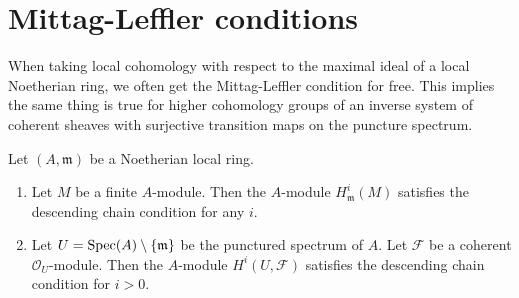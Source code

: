\section{Mittag-Leffler conditions}
\label{section-ML}

\noindent
When taking local cohomology with respect to the maximal ideal
of a local Noetherian ring, we often get the Mittag-Leffler condition
for free. This implies the same thing is true for higher cohomology
groups of an inverse system of coherent sheaves with surjective transition
maps on the puncture spectrum.

\begin{lemma}
\label{lemma-descending-chain}
Let $(A, \mathfrak m)$ be a Noetherian local ring.
\begin{enumerate}
\item Let $M$ be a finite $A$-module. Then the $A$-module
$H^i_\mathfrak m(M)$ satisfies the descending chain condition
for any $i$.
\item Let $U = \mathop{\mathrm{Spec}}(A) \setminus \{\mathfrak m\}$ be the
punctured spectrum of $A$.
Let $\mathcal{F}$ be a coherent $\mathcal{O}_U$-module.
Then the $A$-module $H^i(U, \mathcal{F})$
satisfies the descending chain condition for $i > 0$.
\end{enumerate}
\end{lemma}

